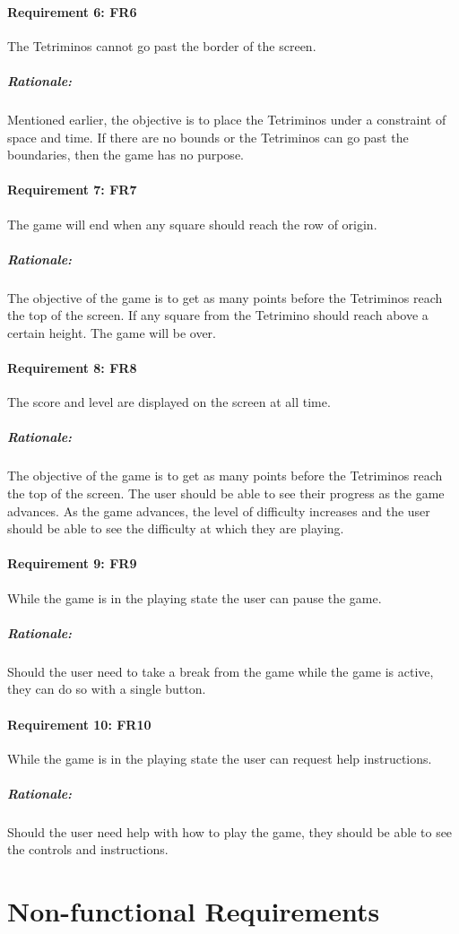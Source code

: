\documentclass[12pt, titlepage]{article}
\begin{document}
\paragraph{Requirement 6: FR6}
The Tetriminos cannot go past the border of the screen.
\subparagraph{Rationale:}
Mentioned earlier, the objective is to place the Tetriminos under a constraint of space and time. If there are no bounds or the Tetriminos can go past the boundaries, then the game has no purpose.

\paragraph{Requirement 7: FR7}
The game will end when any square should reach the row of origin.
\subparagraph{Rationale:}
The objective of the game is to get as many points before the Tetriminos reach the top of the screen. If any square from the Tetrimino should reach above a certain height. The game will be over.

\paragraph{Requirement 8: FR8}
The score and level are displayed on the screen at all time.
\subparagraph{Rationale:}
The objective of the game is to get as many points before the Tetriminos reach the top of the screen. The user should be able to see their progress as the game advances. As the game advances, the level of difficulty increases and the user should be able to see the difficulty at which they are playing.

\paragraph{Requirement 9: FR9}
While the game is in the playing state the user can pause the game. 
\subparagraph{Rationale:}
Should the user need to take a break from the game while the game is active, they can do so with a single button.

\paragraph{Requirement 10: FR10}
While the game is in the playing state the user can request help instructions. 
\subparagraph{Rationale:}
Should the user need help with how to play the game, they should be able to see the controls and instructions.

\section{Non-functional Requirements}
\end{document}
